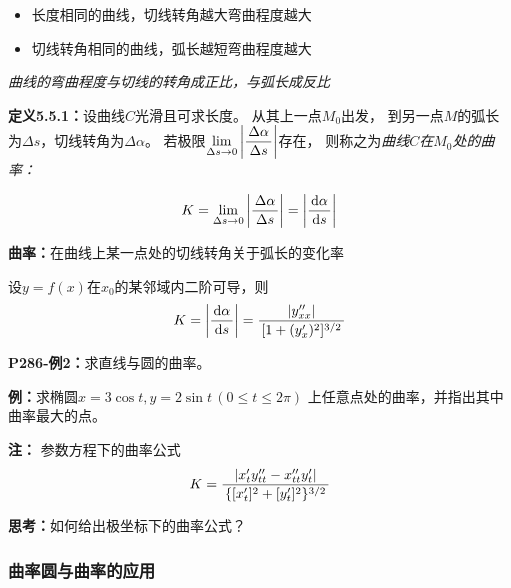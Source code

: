 \begin{itemize}
  \setlength{\itemindent}{1cm}
  \item 长度相同的曲线，切线转角越大弯曲程度越大
  \item 切线转角相同的曲线，弧长越短弯曲程度越大
\end{itemize}

{\it 曲线的弯曲程度与切线的转角成正比，与弧长成反比}

{\bf 定义5.5.1：}设曲线$C$光滑且可求长度。 从其上一点$M_0$出发，
到另一点$M$的弧长为$\Delta s$，切线转角为$\Delta\alpha$。
 若极限$\lim\limits_{\Delta s\to
0}\left|\displaystyle\frac{\,{\Delta\alpha}\,}{\,{\Delta s}\,}\right|$存在，
则称之为{\it 曲线$C$在$M_0$处的曲率：}

$${K=\lim\limits_{\Delta s\to
0}\left|\displaystyle\frac{\,{\Delta\alpha}\,}{\,{\Delta s}\,}\right|
=\left|\displaystyle\frac{\,{\mathrm{d}\alpha}\,}{\,{\mathrm{d} s}\,}\right|}$$ 

{\bf 曲率：}在曲线上某一点处的切线转角关于弧长的变化率


设$y=f(x)$在$x_0$的某邻域内二阶可导，则
{$$K=\left|\displaystyle\frac{\,{\mathrm{d}\alpha}\,}{\,{\mathrm{d} s}\,}\right|
 =\displaystyle\frac{\,{|y''_{xx}|}\,}{\,{[1+(y'_x)^2]^{3/2}}\,}$$}
 
{\bf P286-例2：}求直线与圆的曲率。

{\bf 例：}求椭圆$x=3\cos t,y=2\sin t\,(0\leq t\leq 2\pi)$
上任意点处的曲率，并指出其中曲率最大的点。

\begin{center}
\end{center}

{\bf 注：} {参数方程下的曲率公式}
$${K=\displaystyle\frac{\,{|x'_ty''_{tt}-x''_{tt}y'_t|}\,}{\,{\{[x'_t]^2+[y'_t]^2\}^{3/2}}\,}}$$

{\bf 思考：}如何给出极坐标下的曲率公式？

\subsubsection{曲率圆与曲率的应用}


